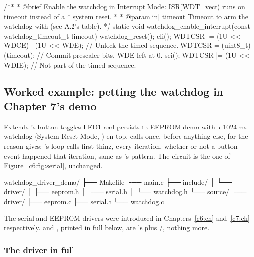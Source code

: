\begin{ccode}
/**
 * @brief Enable the watchdog in Interrupt Mode: ISR(WDT_vect) runs on timeout instead of a
 *        system reset.
 *
 * @param[in] timeout Timeout to arm the watchdog with (see A.2's table).
 */
static void watchdog_enable_interrupt(const watchdog_timeout_t timeout)
{
    watchdog_reset();
    cli();
    WDTCSR |= (1U << WDCE) | (1U << WDE); // Unlock the timed sequence.
    WDTCSR = (uint8_t)(timeout);          // Commit prescaler bits, WDE left at 0.
    sei();
    WDTCSR |= (1U << WDIE);               // Not part of the timed sequence.
}
\end{ccode}

\subsection{Worked example: petting the watchdog in Chapter 7's demo}
\label{c8:a:5}
{\raggedright
Extends 's button-toggles-LED1-and-persists-to-EEPROM demo with a 1024\,ms
watchdog (System Reset Mode, ) on top.  calls
 once, before anything else, for the reason
 gives; 's loop calls  first thing, every
iteration, whether or not a button event happened that iteration, same as 's
pattern. The circuit is the one of Figure~\ref{c6:fig:serial}, unchanged.\par}

\begin{console}
watchdog_driver_demo/
├── Makefile
├── main.c
├── include/
│   └── driver/
│       ├── eeprom.h
│       ├── serial.h
│       └── watchdog.h
└── source/
    └── driver/
        ├── eeprom.c
        ├── serial.c
        └── watchdog.c
\end{console}

\noindent The serial and EEPROM drivers were introduced in Chapters~\ref{c6:ch} and~\ref{c7:ch}
respectively.  and , printed in full below, are
's  plus /,
nothing more.

\subsubsection{The driver in full}

